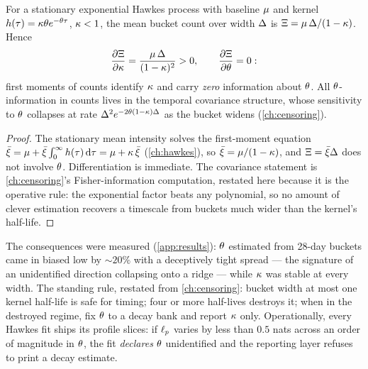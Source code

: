\begin{proposition}\label{prop:ch07:ridge}
For a stationary exponential Hawkes process with baseline $\mu$ and
kernel $h(\tau)=\kappa\theta e^{-\theta\tau}$, $\kappa<1$, the
mean bucket count over width $\Delta$ is
$\Xi = \mu\,\Delta/(1-\kappa)$. Hence
\[
\frac{\partial \Xi}{\partial\kappa}
 = \frac{\mu\,\Delta}{(1-\kappa)^2} > 0,
\qquad
\frac{\partial \Xi}{\partial\theta} = 0 :
\]
first moments of counts identify $\kappa$ and carry \emph{zero}
information about $\theta$. All $\theta$-information in counts lives in
the temporal covariance structure, whose sensitivity to $\theta$
collapses at rate $\Delta^2 e^{-2\theta(1-\kappa)\Delta}$ as the
bucket widens (\cref{ch:censoring}).
\end{proposition}

\begin{proof}
The stationary mean intensity solves the first-moment equation
$\bar\xi = \mu + \bar\xi\int_0^\infty h(\tau)\,\mathrm{d}\tau
 = \mu + \kappa\,\bar\xi$ (\cref{ch:hawkes}), so
$\bar\xi = \mu/(1-\kappa)$, and $\Xi = \bar\xi\Delta$ does not
involve $\theta$. Differentiation is immediate. The covariance statement
is \cref{ch:censoring}'s Fisher-information computation, restated here
because it is the operative rule: the exponential factor beats any
polynomial, so no amount of clever estimation recovers a timescale from
buckets much wider than the kernel's half-life.
\end{proof}

The consequences were measured (\cref{app:results}): $\theta$ estimated
from 28-day buckets came in biased low by ${\sim}20\%$ with a deceptively
tight spread --- the signature of an unidentified direction collapsing
onto a ridge --- while $\kappa$ was stable at every width. The standing
rule, restated from \cref{ch:censoring}: bucket width at most one kernel
half-life is safe for timing; four or more half-lives destroys it; when
in the destroyed regime, fix $\theta$ to a decay bank and report
$\kappa$ only. Operationally, every Hawkes fit ships its profile slices:
if $\ell_p$ varies by less than $0.5$ nats across an order of
magnitude in $\theta$, the fit \emph{declares} $\theta$ unidentified and
the reporting layer refuses to print a decay estimate.

